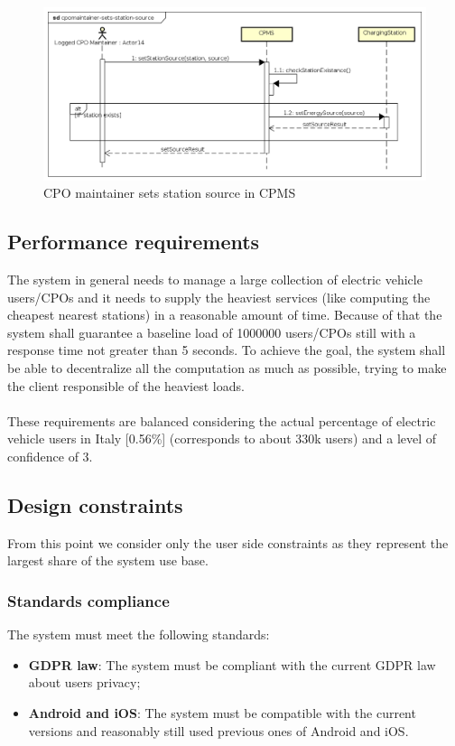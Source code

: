 \begin{figure}[!h]
    \begin{center}
        \includegraphics[keepaspectratio, width=16cm]{Sequence/cpomaintainer-sets-station-source.png}
        \caption{\ac{CPO} maintainer sets station source in \ac{CPMS}}
    \end{center}
\end{figure}

\clearpage
\subsection{Performance requirements}
The system in general needs to manage a large collection of electric vehicle users/\acp{CPO} and it needs to supply the heaviest services (like computing the cheapest nearest stations) in a reasonable amount of time.
Because of that the system shall guarantee a baseline load of 1000000 users/\acp{CPO} still with a response time not greater than 5 seconds. To achieve the goal, the system shall be able to decentralize all the computation as much as possible,
trying to make the client responsible of the heaviest loads.\\\\
These requirements are balanced considering the actual percentage of electric vehicle users in Italy [0.56\%] (corresponds to about 330k users) and a level of confidence of 3.
\subsection{Design constraints}
From this point we consider only the user side constraints as they represent the largest share of the system use base.
\subsubsection{Standards compliance}
The system must meet the following standards:
\begin{itemize}
    \item \textbf{\ac{GDPR} law}: The system must be compliant with the current GDPR law about users privacy;
    \item \textbf{Android and iOS}: The system must be compatible with the current versions and reasonably still used previous ones of Android and iOS.
\end{itemize}
